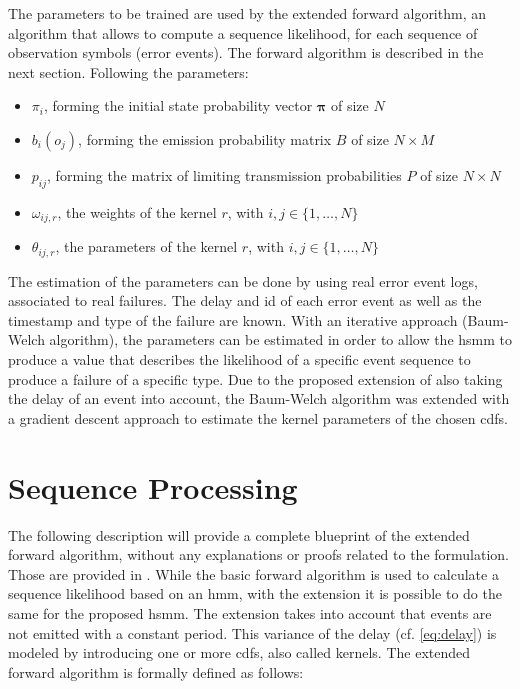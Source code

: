 \documentclass[mscthesis]{usiinfthesis}
\begin{document}
The parameters to be trained are used by the extended forward algorithm, an
algorithm that allows to compute a sequence likelihood, for each sequence of
observation symbols (error events). The forward algorithm is described in
the next section. Following the parameters:
\begin{itemize}
    \item $ \pi_i $, forming the initial state probability vector
        $ \boldsymbol{\pi} $ of size $ N $
    \item $ b_i(o_j) $, forming the emission probability matrix $ B $ of size
        $ N \times M $
    \item $ p_{ij} $, forming the matrix of limiting transmission probabilities
        $ P $ of size $ N \times N $
    \item $ \omega_{ij, r} $, the weights of the kernel $ r $, with
        $i,j \in \{1, \dots, N\} $
    \item $ \theta_{ij, r} $, the parameters of the kernel $ r $, with
        $i,j \in \{1, \dots, N\} $
\end{itemize}

The estimation of the parameters can be done by using real error event logs,
associated to real failures. The delay and id of each error event as well as
the timestamp and type of the failure are known. With an iterative approach
(Baum-Welch algorithm), the parameters can be estimated in order to allow the
\gls{hsmm} to produce a value that describes the likelihood of a specific event
sequence to produce a failure of a specific type. Due to the proposed extension
of also taking the delay of an event into account, the Baum-Welch algorithm was
extended with a gradient descent approach to estimate the kernel parameters of
the chosen \glspl{cdf}.

\section{Sequence Processing}
\label{ch:event_sequ}

The following description will provide a complete blueprint of the extended
forward algorithm, without any explanations or proofs related to the
formulation. Those are provided in \cite{salfner08}. While the basic forward
algorithm is used to calculate a sequence likelihood based on an \gls{hmm}, with
the extension it is possible to do the same for the proposed \gls{hsmm}. The
extension takes into account that events are not emitted with a constant
period.  This variance of the delay (cf. \ref{eq:delay}) is modeled by
introducing one or more \glspl{cdf}, also called kernels. The extended forward
algorithm is formally defined as follows:
\end{document}
